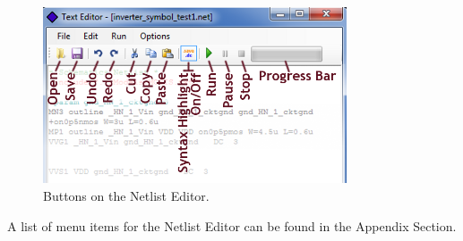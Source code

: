 \begin{figure}[htb]
  \centering
    \includegraphics[width=0.8\textwidth]
		{./figures/appendix_buttons_menus_figures/NetlistEditor_AllButtons.png}
    \caption{Buttons on the Netlist Editor.}
  \label{fig_netlisteditor_allbuttons_inchapter}
\end{figure} 

A list of menu items for the Netlist Editor can be found in the Appendix Section.
